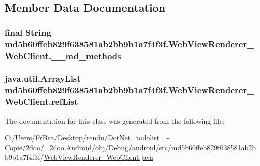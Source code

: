 \subsection{Member Data Documentation}
\hypertarget{classmd5b60ffeb829f638581ab2bb9b1a7f4f3f_1_1_web_view_renderer___web_client_b15ec026f7472a54d028a56570e44543}{
\subsubsection[{\_\-\_\-md\_\-methods}]{\setlength{\rightskip}{0pt plus 5cm}final String {\bf md5b60ffeb829f638581ab2bb9b1a7f4f3f.WebViewRenderer\_\-WebClient.\_\-\_\-md\_\-methods}}}
\label{classmd5b60ffeb829f638581ab2bb9b1a7f4f3f_1_1_web_view_renderer___web_client_b15ec026f7472a54d028a56570e44543}


\hypertarget{classmd5b60ffeb829f638581ab2bb9b1a7f4f3f_1_1_web_view_renderer___web_client_71f15194255a9d336085332b3a20da84}{
\subsubsection[{refList}]{\setlength{\rightskip}{0pt plus 5cm}java.util.ArrayList {\bf md5b60ffeb829f638581ab2bb9b1a7f4f3f.WebViewRenderer\_\-WebClient.refList}}}
\label{classmd5b60ffeb829f638581ab2bb9b1a7f4f3f_1_1_web_view_renderer___web_client_71f15194255a9d336085332b3a20da84}




The documentation for this class was generated from the following file:\begin{CompactItemize}
\item 
C:/Users/FrBea/Desktop/rendu/DotNet\_\-todolist\_ - Copie/2doo/\_\-2doo.Android/obj/Debug/android/src/md5b60ffeb829f638581ab2bb9b1a7f4f3f/\hyperlink{_web_view_renderer___web_client_8java}{WebViewRenderer\_\-WebClient.java}\end{CompactItemize}
